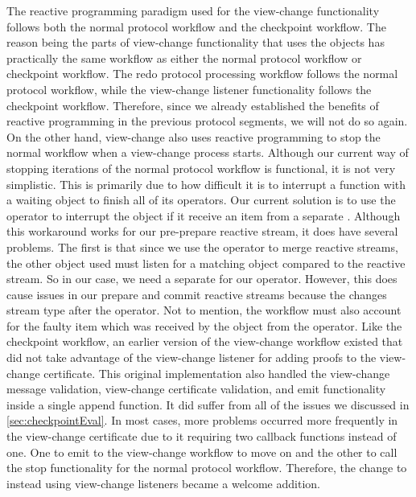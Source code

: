 The reactive programming paradigm used for the view-change functionality follows both the normal protocol workflow and the checkpoint workflow. The reason being the parts of view-change functionality that uses the  objects has practically the same workflow as either the normal protocol workflow or checkpoint workflow. The redo protocol processing workflow follows the normal protocol workflow, while the view-change listener functionality follows the checkpoint workflow. Therefore, since we already established the benefits of reactive programming in the previous protocol segments, we will not do so again. On the other hand, view-change also uses reactive programming to stop the normal workflow when a view-change process starts. Although our current way of stopping iterations of the normal protocol workflow is functional, it is not very simplistic.  This is primarily due to how difficult it is to interrupt a function with a waiting  object to finish all of its operators. Our current solution is to use the  operator to interrupt the  object if it receive an item from a separate . Although this workaround works for our pre-prepare reactive stream, it does have several problems. The first is that since we use the  operator to merge reactive streams, the other  object used must listen for a matching object compared to the reactive stream. So in our case, we need a separate  for our  operator. However, this does cause issues in our prepare and commit reactive streams because the changes stream type after the  operator. Not to mention, the workflow must also account for the faulty item which was received by the  object from the  operator. Like the checkpoint workflow, an earlier version of the view-change workflow existed that did not take advantage of the view-change listener for adding proofs to the view-change certificate. This original implementation also handled the view-change message validation, view-change certificate validation, and emit functionality inside a single append function. It did suffer from all of the issues we discussed in \autoref{sec:checkpointEval}. In most cases, more problems occurred more frequently in the view-change certificate due to it requiring two callback functions instead of one. One to emit to the view-change workflow to move on and the other to call the stop functionality for the normal protocol workflow. Therefore, the change to instead using view-change listeners became a welcome addition.
\fi